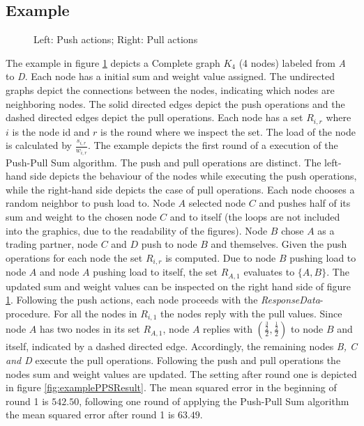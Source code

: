 \subsection{Example}\label{subsec:examplePPS}
\begin{figure}
    \centering
    
    \caption{Left: Push actions; Right: Pull actions}
    \label{fig:examplePPSSetting}
\end{figure}
The example in figure \ref{fig:examplePPSSetting} depicts a Complete graph $K_4$ (4 nodes) labeled from \textit{A} to \textit{D}. Each node has a initial sum and weight value assigned. The undirected graphs depict the connections between the nodes, indicating which nodes are neighboring nodes. The solid directed edges depict the push operations and the dashed directed edges depict the pull operations. Each node has a set $R_{i,r}$ where $i$ is the node id and $r$ is the round where we inspect the set. The load of the node is calculated by $\frac{s_{i,r}}{w_{i,r}}$. The example depicts the first round of a execution of the Push-Pull Sum algorithm. The push and pull operations are distinct. The left-hand side depicts the behaviour of the nodes while executing the push operations, while the right-hand side depicts the case of pull operations. Each node chooses a random neighbor to push load to. Node $A$ selected node $C$ and pushes half of its sum and weight to the chosen node $C$ and to itself (the loops are not included into the graphics, due to the readability of the figures). Node $B$ chose $A$ as a trading partner, node $C$ and $D$ push to node $B$ and themselves. Given the push operations for each node the set $R_{i,r}$ is computed. Due to node $B$ pushing load to node $A$ and node $A$ pushing load to itself, the set $R_{A,1}$ evaluates to $\{A,B\}$. The updated sum and weight values can be inspected on the right hand side of figure \ref{fig:examplePPSSetting}. Following the push actions, each node proceeds with the \textit{ResponseData}-procedure. For all the nodes in $R_{i,1}$ the nodes reply with the pull values. Since node $A$ has two nodes in its set $R_{A,1}$, node $A$ replies with $\left(\frac{\frac{3}{2}}{2}, \frac{\frac{1}{2}}{2}\right)$ to node $B$ and itself, indicated by a dashed directed edge. Accordingly, the remaining nodes \textit{B, C and D} execute the pull operations. Following the push and pull operations the nodes sum and weight values are updated. The setting after round one is depicted in figure \ref{fig:examplePPSResult}. The mean squared error in the beginning of round 1 is $542.50$, following one round of applying the Push-Pull Sum algorithm the mean squared error after round 1 is $63.49$.

